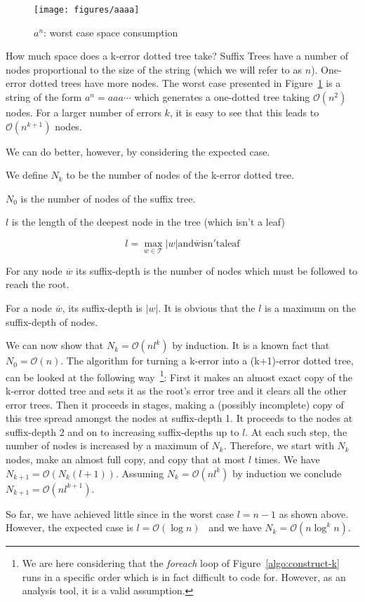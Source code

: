 \begin{figure}
\texttt{[image: figures/aaaa]}
\caption{$a^n$: worst case space consumption}%
\label{fig:aaaa}
\end{figure}

How much space does a k-error dotted tree take? Suffix Trees have a number of nodes proportional to the size of the string (which we will refer to as $n$). One-error dotted trees have more nodes. The worst case presented in Figure~\ref{fig:aaaa} is a string of the form $a^n = aaa\cdots$ which generates a one-dotted tree taking $\mathcal{O}(n^2)$ nodes. For a larger number of errors $k$, it is easy to see that this leads to $\mathcal{O}(n^{k+1})$ nodes.

We can do better, however, by considering the expected case.

\begin{definition}
We define $N_k$ to be the number of nodes of the k-error dotted tree.

$N_0$ is the number of nodes of the suffix tree.
\end{definition}

\begin{definition}
$l$ is the length of the deepest node in the tree (which isn't a leaf)

\[ l = \max_{\overline{w} \in \mathcal{T}} |w| \mathrm{and \overline{w} isn't a leaf} \]
\end{definition}

\begin{definition}
For any node $\overline{w}$ its suffix-depth is the number of nodes which must be followed to reach the root.
\end{definition}

For a node $\overline{w}$, its suffix-depth is $|w|$. It is obvious that the $l$ is a maximum on the suffix-depth of nodes.

We can now show that $N_k = \mathcal{O}(nl^k)$ by induction. It is a known fact that $N_0 = \mathcal{O}(n)$. The algorithm for turning a k-error into a (k+1)-error dotted tree, can be looked at the following way~\footnote{We are here considering that the \textit{foreach} loop of Figure~\ref{algo:construct-k} runs in a specific order which is in fact difficult to code for. However, as an analysis tool, it is a valid assumption.}: First it makes an almost exact copy of the k-error dotted tree and sets it as the root's error tree and it clears all the other error trees. Then it proceeds in stages, making a (possibly incomplete) copy of this tree spread amongst the nodes at suffix-depth 1. It proceeds to the nodes at suffix-depth 2 and on to increasing suffix-depths up to $l$. At each such step, the number of nodes is increased by a maximum of $N_k$. Therefore, we start with $N_k$ nodes, make an almost full copy, and copy that at most $l$ times. We have $N_{k+1}=\mathcal{O}(N_k(l+1))$. Assuming $N_k=\mathcal{O}(nl^k)$ by induction we conclude $N_{k+1}=\mathcal{O}(nl^{k+1})$.

So far, we have achieved little since in the worst case $l=n-1$ as shown above. However, the expected case is $l=\mathcal{O}(\log n)$~\cite{apostolico92selfalignments} and we have $N_k=\mathcal{O}(n\log^k n)$.

